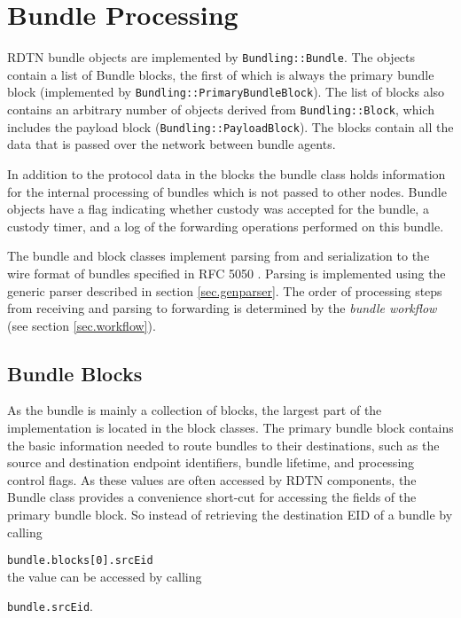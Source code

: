 \documentclass{article}
\begin{document}
\section{Bundle Processing}\label{sec.bundle-proc}

RDTN bundle objects are implemented by {\tt Bundling::Bundle}. The objects
contain a list of Bundle blocks, the first of which is always the primary bundle
block (implemented by {\tt Bundling::PrimaryBundleBlock}). The list of blocks
also contains an arbitrary number of objects derived from {\tt Bundling::Block},
which includes the payload block ({\tt Bundling::PayloadBlock}). The blocks
contain all the data that is passed over the network between bundle agents. 

In addition to the protocol data in the blocks the bundle class holds
information for the internal processing of bundles which is not passed to other
nodes.  Bundle objects have a flag indicating whether custody was accepted for
the bundle, a custody timer, and a log of the forwarding operations performed on
this bundle.

The bundle and block classes implement parsing from and serialization to the
wire format of bundles specified in RFC 5050 \cite{bundle-spec}. Parsing is
implemented using the generic parser described in section \ref{sec.genparser}.
The order of processing steps from receiving and parsing to forwarding is
determined by the {\em bundle workflow} (see section \ref{sec.workflow}).

\subsection{Bundle Blocks}\label{sec.bundle-blocks}

As the bundle is mainly a collection of blocks, the largest part of the
implementation is located in the block classes. The primary bundle block
contains the basic information needed to route bundles to their destinations,
such as the source and destination endpoint identifiers, bundle lifetime, and
processing control flags. As these values are often accessed by RDTN components,
the Bundle class provides a convenience short-cut for accessing the fields of
the primary bundle block. So instead of retrieving the destination EID of a
bundle by calling

{\tt bundle.blocks[0].srcEid}\\
the value can be accessed by calling

{\tt bundle.srcEid}.
\end{document}
